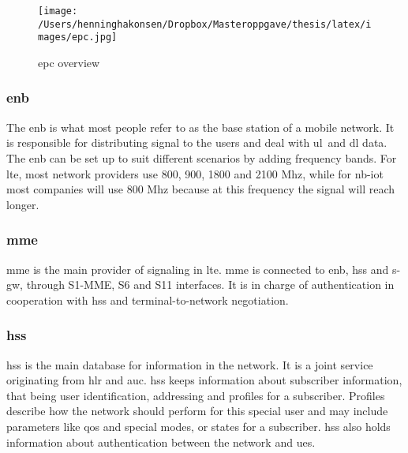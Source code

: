 \documentclass[USenglish]{ifimaster}  %
\begin{document}
\begin{figure}[H]
  \centering\texttt{[image: /Users/henninghakonsen/Dropbox/Masteroppgave/thesis/latex/images/epc.jpg]}
  \caption[\acrlong{epc} overview]{\acrlong{epc} overview \cite{online:lteTopology}}
  \label{online:lteTopology}
\end{figure}

\subsubsection{\acrshort{enb}}
The \acrfull{enb} is what most people refer to as the base station of a mobile network. It is responsible for distributing signal to the users and deal with \acrshort{ul} and \acrshort{dl} data. The \acrshort{enb} can be set up to suit different scenarios by adding frequency bands. For \acrshort{lte}, most network providers use 800, 900, 1800 and 2100 Mhz, while for \acrshort{nb-iot} most companies will use 800 Mhz because at this frequency the signal will reach longer.

\subsubsection{\acrshort{mme}}
\acrfull{mme} is the main provider of signaling in \acrshort{lte}. \acrshort{mme} is connected to \acrshort{enb}, \acrshort{hss} and \acrshort{s-gw}, through S1-MME, S6 and S11 interfaces. It is in charge of authentication in cooperation with \acrshort{hss} and terminal-to-network negotiation.

\subsubsection{\acrshort{hss}}
\acrfull{hss} is the main database for information in the network. It is a joint service originating from \acrfull{hlr} and \acrfull{auc}. \acrshort{hss} keeps information about subscriber information, that being user identification, addressing and profiles for a subscriber. Profiles describe how the network should perform for this special user and may include parameters like \acrfull{qos} and special modes, or states for a subscriber. \acrshort{hss} also holds information about authentication between the network and \acrshort{ue}s.
\end{document}
